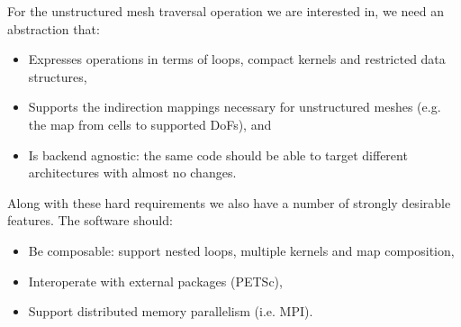 \documentclass[thesis]{subfiles}
\begin{document}
\cite{stroutSparsePolyhedralFramework2018} %
\cite{mirchandaneyPrinciplesRuntimeSupport1988} %
\cite{arenazInspectorExecutorAlgorithmIrregular2004} %

For the unstructured mesh traversal operation we are interested in, we need an abstraction that:

\begin{itemize}
  \item
    Expresses operations in terms of loops, compact kernels and restricted data structures,
  \item
    Supports the indirection mappings necessary for unstructured meshes (e.g. the map from cells to supported DoFs), and
  \item
    Is backend agnostic: the same code should be able to target different architectures with almost no changes.
\end{itemize}

Along with these hard requirements we also have a number of strongly desirable features.
The software should:

\begin{itemize}
  \item
    Be composable: support nested loops, multiple kernels and map composition,

  \item
    Interoperate with external packages (PETSc),

  \item
    Support distributed memory parallelism (i.e. MPI).
\end{itemize}
\end{document}
